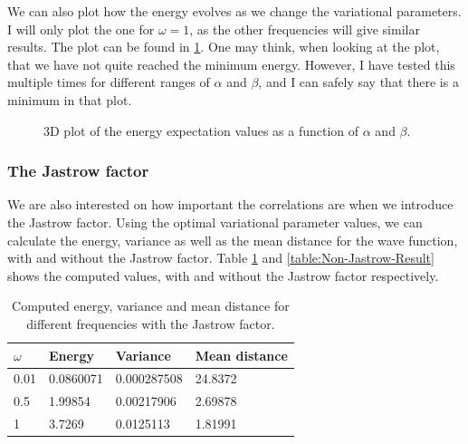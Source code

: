 \documentclass[12pt]{article}
\begin{document}
We can also plot how the energy evolves as we change the variational parameters. I will only plot the one for $\omega = 1$, as the other frequencies will give similar results. The plot can be found in \ref{fig:3DPlot_AlphaBeta_Optimal}.  One may think, when looking at the plot, that we have not quite reached the minimum energy. However, I have tested this multiple times for different ranges of $\alpha$ and $\beta$, and I can safely say that there is a minimum in that plot.
\begin{figure}[h]
\centering
\caption{3D plot of the energy expectation values as a function of $\alpha$ and $\beta$.}
\label{fig:3DPlot_AlphaBeta_Optimal}
\end{figure}

\FloatBarrier
\subsubsection{The Jastrow factor}
We are also interested on how important the correlations are when we introduce the Jastrow factor. Using the optimal variational parameter values, we can calculate the energy, variance as well as the mean distance for the wave function, with and without the Jastrow factor. Table \ref{table:Jastrow-Result} and \ref{table:Non-Jastrow-Result} shows the computed values, with and without the Jastrow factor respectively.

\begin{table}
\begin{center}
	\begin{tabular}{| l | l | l | l |}
	\hline
	 $\omega$ & Energy & Variance & Mean distance \\ \hline
	 0.01 & 0.0860071 & 0.000287508 & 24.8372 \\
	 0.5 & 1.99854 & 0.00217906 & 2.69878 \\
	 1 & 3.7269 & 0.0125113 & 1.81991 \\ \hline
	\end{tabular}
\caption{Computed energy, variance and mean distance for different frequencies with the Jastrow factor.}
\label{table:Jastrow-Result}
\end{center}
\end{table}
\end{document}
